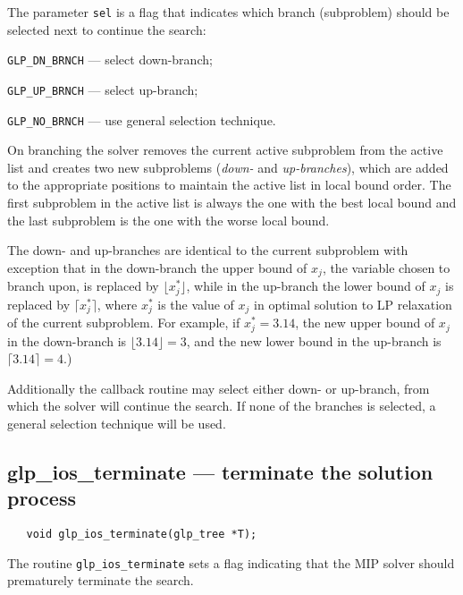 The parameter \verb|sel| is a flag that indicates which branch
(subproblem) should be selected next to continue the search:

\verb|GLP_DN_BRNCH| --- select down-branch;

\verb|GLP_UP_BRNCH| --- select up-branch;

\verb|GLP_NO_BRNCH| --- use general selection technique.

\newpage


On branching the solver removes the current active subproblem from the
active list and creates two new subproblems ({\it down-} and {\it
up-branches}), which are added to the appropriate positions to maintain
the active list in local bound order. The first subproblem in the active
list is always the one with the best local bound and the last subproblem
is the one with the worse local bound.

The down- and up-branches are identical to the current subproblem with
exception that in the down-branch the upper bound of $x_j$, the variable
chosen to branch upon, is replaced by $\lfloor x_j^*\rfloor$, while in
the up-branch the lower bound of $x_j$ is replaced by
$\lceil x_j^*\rceil$, where $x_j^*$ is the value of $x_j$ in optimal
solution to LP relaxation of the current subproblem. For example, if
$x_j^*=3.14$, the new upper bound of $x_j$ in the down-branch is
$\lfloor 3.14\rfloor=3$, and the new lower bound in the up-branch is
$\lceil 3.14\rceil=4$.)

Additionally the callback routine may select either down- or up-branch,
from which the solver will continue the search. If none of the branches
is selected, a general selection technique will be used.

\subsection{glp\_ios\_terminate --- terminate the solution process}

\synopsis

\begin{verbatim}
   void glp_ios_terminate(glp_tree *T);
\end{verbatim}

\description

The routine \verb|glp_ios_terminate| sets a flag indicating that the
MIP solver should prematurely terminate the search.


